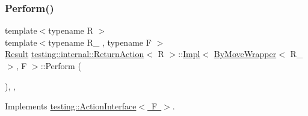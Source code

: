 \subsubsection{\texorpdfstring{Perform()}{Perform()}\hspace{0.1cm}{\footnotesize\ttfamily [2/3]}}
{\footnotesize\ttfamily template$<$typename R $>$ \\
template$<$typename R\+\_\+ , typename F $>$ \\
\mbox{\hyperlink{classtesting_1_1_action_interface_a7477de2fe3e4e01c59db698203acaee7}{Result}} \mbox{\hyperlink{classtesting_1_1internal_1_1_return_action}{testing\+::internal\+::\+Return\+Action}}$<$ R $>$\+::\mbox{\hyperlink{classtesting_1_1internal_1_1_return_action_1_1_impl}{Impl}}$<$ \mbox{\hyperlink{structtesting_1_1internal_1_1_by_move_wrapper}{By\+Move\+Wrapper}}$<$ R\+\_\+ $>$, F $>$\+::Perform (\begin{DoxyParamCaption}\item[{const \mbox{\hyperlink{classtesting_1_1_action_interface_af72720d864da4d606629e83edc003511}{Argument\+Tuple}} \&}]{ }\end{DoxyParamCaption})\hspace{0.3cm}{\ttfamily [inline]}, {\ttfamily [override]}, {\ttfamily [virtual]}}



Implements \mbox{\hyperlink{classtesting_1_1_action_interface_a20f8624fcea1786f2992b358760422a0}{testing\+::\+Action\+Interface$<$ F $>$}}.

\mbox{\label{classtesting_1_1internal_1_1_return_action_1_1_impl_3_01_by_move_wrapper_3_01_r___01_4_00_01_f_01_4_a4f6e45f593abffb7a8b26cebfc4a0262}} 
